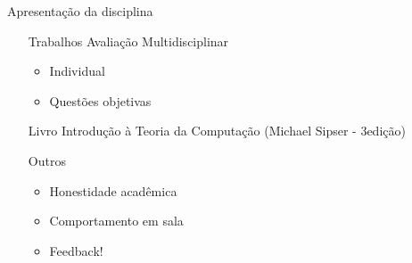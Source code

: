 \documentclass{beamer}
\begin{document}
\begin{frame}{Apresentação da disciplina}
   	\begin{itemize}
   		\item[Trabalhos] Avaliação Multidisciplinar
   		\begin{itemize}
   			\item Individual
   			\item Questões objetivas
   		\end{itemize}
   		\item[Livro] Introdução à Teoria da Computação (Michael Sipser - 3\textordfeminine edição)
   		\item[Outros]
   		\begin{itemize}
   			\item Honestidade acadêmica
   			\item Comportamento em sala
   			\item Feedback!
   		\end{itemize}
   	\end{itemize}
\end{frame}
\end{document}
